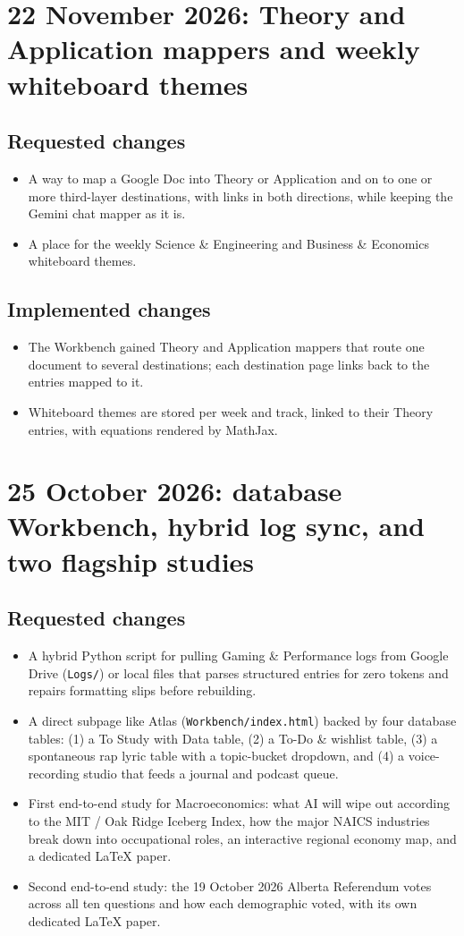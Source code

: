 \documentclass[11pt]{article}
\begin{document}
\section{22 November 2026: Theory and Application mappers and weekly whiteboard themes}
\subsection{Requested changes}
\begin{itemize}
\item A way to map a Google Doc into Theory or Application and on to one or more third-layer destinations, with links in both directions, while keeping the Gemini chat mapper as it is.
\item A place for the weekly Science \& Engineering and Business \& Economics whiteboard themes.
\end{itemize}
\subsection{Implemented changes}
\begin{itemize}
\item The Workbench gained Theory and Application mappers that route one document to several destinations; each destination page links back to the entries mapped to it.
\item Whiteboard themes are stored per week and track, linked to their Theory entries, with equations rendered by MathJax.
\end{itemize}

\section{25 October 2026: database Workbench, hybrid log sync, and two flagship studies}
\subsection{Requested changes}
\begin{itemize}
\item A hybrid Python script for pulling Gaming \& Performance logs from Google Drive (\texttt{Logs/}) or local files that parses structured entries for zero tokens and repairs formatting slips before rebuilding.
\item A direct subpage like Atlas (\texttt{Workbench/index.html}) backed by four database tables: (1) a To Study with Data table, (2) a To-Do \& wishlist table, (3) a spontaneous rap lyric table with a topic-bucket dropdown, and (4) a voice-recording studio that feeds a journal and podcast queue.
\item First end-to-end study for Macroeconomics: what AI will wipe out according to the MIT / Oak Ridge Iceberg Index, how the major NAICS industries break down into occupational roles, an interactive regional economy map, and a dedicated LaTeX paper.
\item Second end-to-end study: the 19 October 2026 Alberta Referendum votes across all ten questions and how each demographic voted, with its own dedicated LaTeX paper.
\end{itemize}
\end{document}
